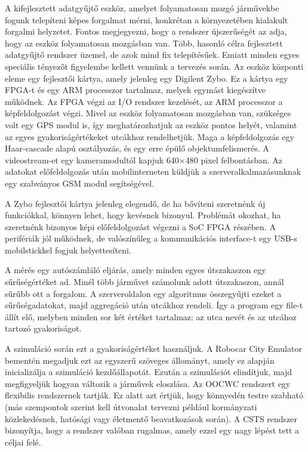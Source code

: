 \documentclass[a4paper,12pt]{report}
\begin{document}
A kifejlesztett adatgyűjtő eszköz, amelyet folyamatosan mozgó járművekbe fogunk telepíteni képes forgalmat mérni, konkrétan a környezetében kialakult forgalmi helyzetet. Fontos megjegyezni, hogy a rendszer újszerűségét az adja, hogy az eszköz folyamatosan mozgásban van. Több, hasonló célra fejlesztett adatgyűjtő rendszer üzemel, de azok mind fix telepítésűek. Emiatt minden egyes speciális tényezőt figyelembe kellett vennünk a tervezés során. Az eszköz központi eleme egy fejlesztői kártya, amely jelenleg egy Digilent Zybo. Ez a kártya egy FPGA-t és egy ARM processzor tartalmaz, melyek egymást kiegészítve működnek. Az FPGA végzi az I/O rendszer kezelését, az ARM processzor a képfeldolgozást végzi. Mivel az eszköz folyamatosan mozgásban van, szükséges volt egy GPS modul is, így meghatározhatjuk az eszköz pontos helyét, valamint az egyes gyakoriságértékeket utcákhoz rendelhetjük. Maga a képfeldolgozás egy Haar-cascade alapú osztályozás, és egy erre épülő objektumfelismerés. A videostream-et egy kameramodultól kapjuk 640$\times$480 pixel felbontásban. Az adatokat előfeldolgozás után mobilinterneten küldjük a szerveralkalmazásunknak egy szabványos GSM modul segítségével.

A Zybo fejlesztői kártya jelenleg elegendő, de ha bővíteni szeretnénk új funkciókkal, könnyen lehet, hogy kevésnek bizonyul. Problémát okozhat, ha szeretnénk bizonyos képi előfeldolgozást végezni a SoC FPGA részében. A perifériák jól működnek, de valószínűleg a kommunikációs interface-t egy USB-s mobilstickkel fogjuk helyettesíteni.

A mérés egy autószámláló eljárás, amely minden egyes útszakaszon egy sűrűségértéket ad. Minél több járművet számolunk adott útszakaszon, annál sűrűbb ott a forgalom. A szerveroldalon egy algoritmus összegyűjti ezeket a sűrűségadatokat, majd aggregáció után utcákhoz rendeli. Így a program egy file-t állít elő, melyben minden sor két értéket tartalmaz: az utca nevét és az utcához tartozó gyakoriságot.

A szimuláció során ezt a gyakoriságértéket használjuk. A Robocar City Emulator bementén megadjuk ezt az egyszerű szöveges állományt, amely ez alapján inicializálja a szimuláció kezdőállapotát. Ezután a szimulációt elindítjuk, majd megfigyeljük hogyan változik a járművek eloszlása. Az OOCWC rendszert egy flexibilis rendszernek tartják. Ez alatt azt értjük, hogy könnyedén testre szabható (más szempontok szerint kell útvonalat tervezni például kormányzati közlekedésnek, hatósági vagy életmentő beavatkozások során). A CSTS rendszer bizonyítja, hogy a rendszer valóban rugalmas, amely ezzel egy nagy lépést tett a céljai felé. 
\end{document}
